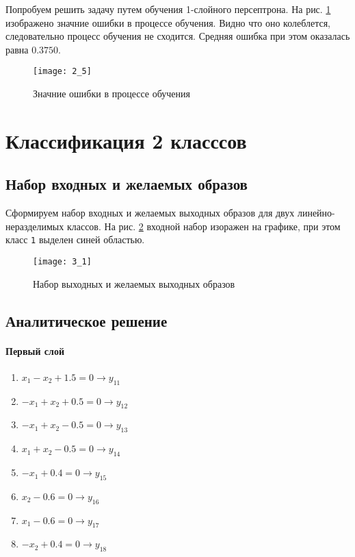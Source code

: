 Попробуем решить задачу путем обучения 1-слойного персептрона. На рис. \ref{fig:2_5} изображено значние ошибки в процессе обучения. Видно что оно колеблется, следовательно процесс обучения не сходится. Средняя ошибка при этом оказалась равна $0.3750$.

\begin{figure}[H]
\begin{center}
	\texttt{[image: 2\_5]}
	\caption{Значние ошибки в процессе обучения}
	\label{fig:2_5}
\end{center}
\end{figure}

\section{Классификация 2 класссов}

\subsection{Набор входных и желаемых образов}

Сформируем набор входных и желаемых выходных образов для двух линейно-неразделимых классов. На рис. \ref{fig:3_1} входной набор изоражен на графике, при этом класс \verb+1+ выделен синей областью.

\begin{figure}[H]
\begin{center}
	\texttt{[image: 3\_1]}
	\caption{Набор выходных и желаемых выходных образов}
	\label{fig:3_1}
\end{center}
\end{figure}

\subsection{Аналитическое решение}


\paragraph{Первый слой}
\begin{enumerate}
	\item $x_1 - x_2 + 1.5 = 0 \rightarrow y_{11}$
	\item $-x_1 + x_2 + 0.5 = 0 \rightarrow y_{12}$
	\item $-x_1 + x_2 - 0.5 = 0 \rightarrow y_{13}$
	\item $x_1 + x_2 - 0.5 = 0 \rightarrow y_{14}$
	\item $-x_1 + 0.4 = 0 \rightarrow y_{15}$
	\item $x_2 - 0.6 = 0 \rightarrow y_{16}$
	\item $x_1 - 0.6 = 0 \rightarrow y_{17}$
	\item $-x_2 + 0.4 = 0 \rightarrow y_{18}$
\end{enumerate}

